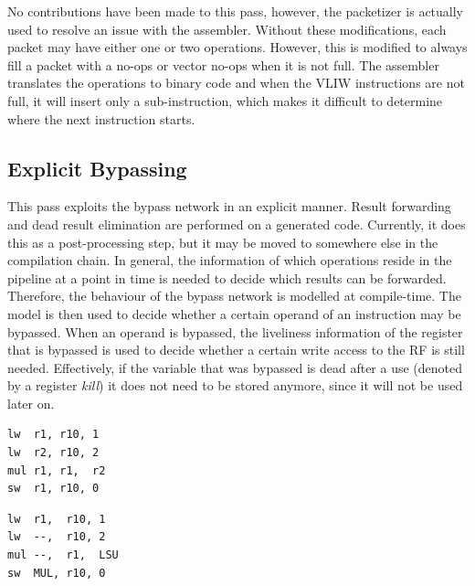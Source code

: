 No contributions have been made to this pass, however, the packetizer is actually used to resolve an issue with the assembler. Without these modifications, each packet may have either one or two operations. However, this is modified to always fill a packet with a no-ops or vector no-ops when it is not full. The assembler translates the operations to binary code and when the VLIW instructions are not full, it will insert only a sub-instruction, which makes it difficult to determine where the next instruction starts. 



\subsection{Explicit Bypassing}
This pass exploits the bypass network in an explicit manner. Result forwarding and dead result elimination are performed on a generated code. Currently, it does this as a post-processing step, but it may be moved to somewhere else in the compilation chain. In general, the information of which operations reside in the pipeline at a point in time is needed to decide which results can be forwarded. Therefore, the behaviour of the bypass network is modelled at compile-time. The model is then used to decide whether a certain operand of an instruction may be bypassed. When an operand is bypassed, the liveliness information of the register that is bypassed is used to decide whether a certain write access to the RF is still needed. Effectively, if the variable that was bypassed is dead after a use (denoted by a register \emph{kill}) it does not need to be stored anymore, since it will not be used later on. 

\label{lst:explicit_reg_alloc}
\begin{center}
\hspace{2px}\begin{minipage}{.475\textwidth}
\begin{lstlisting}[frame=tlrb]
lw  r1, r10, 1
lw  r2, r10, 2
mul r1, r1,  r2
sw  r1, r10, 0
\end{lstlisting}
\end{minipage}\hfill
\begin{minipage}{.475\textwidth}
\begin{lstlisting}[frame=tlrb]
lw  r1,  r10, 1
lw  --,  r10, 2
mul --,  r1,  LSU
sw  MUL, r10, 0
\end{lstlisting}
\end{minipage}
\end{center}

